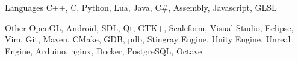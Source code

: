


\begin{cvskills}


\cvskill
{Languages} %
{C++, C, Python, Lua, Java, C\#, Assembly, Javascript, GLSL } %


\cvskill
{Other}
    {OpenGL, Android, SDL, Qt, GTK+, Scaleform, Visual Studio, Eclipse, Vim, Git, Maven, CMake, GDB, pdb, Stingray Engine, Unity Engine, Unreal Engine, Arduino, nginx, Docker, PostgreSQL, Octave}



\end{cvskills}
